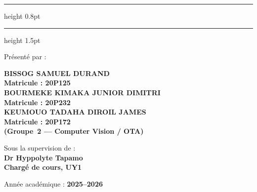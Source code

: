 \begin{titlepage}
\vspace{4mm}
{\color{enspyblue}\hrule height 0.8pt\vspace{1.5pt}\hrule height 1.5pt\par}
\vspace{6mm}

\begin{center}
{\large\bfseries \CoverDocType\par}
\vspace{7mm}

Présenté par :\\[3mm]
{\color{enspyblue}\bfseries
  BISSOG SAMUEL DURAND\\[1mm]
  {\normalsize Matricule : 20P125}\\[3mm]
  BOURMEKE KIMAKA JUNIOR DIMITRI\\[1mm]
  {\normalsize Matricule : 20P232}\\[3mm]
  KEUMOUO TADAHA DIROIL JAMES\\[1mm]
  {\normalsize Matricule : 20P172}\\[2mm]
  {\normalsize\color{black}(Groupe~2 --- Computer Vision / OTA)}
\par}

\vspace{8mm}
Sous la supervision de :\\[2mm]
{\color{enspyblue}\bfseries\large Dr Hyppolyte Tapamo\\[1mm]
{\normalsize Charg\'e de cours, UY1}}
\end{center}

\vfill

\begin{center}
{\large Année académique : \textbf{2025--2026}\par}
\end{center}

\end{titlepage}

